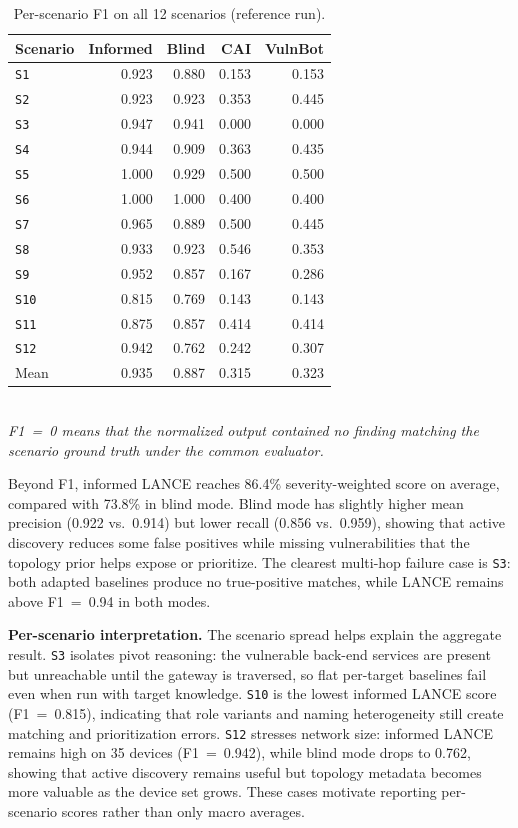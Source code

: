 \documentclass[conference,compsoc]{IEEEtran}
\newcommand{\harnessname}{\textsc{LANCE}\xspace}
\begin{document}
\begin{table}[h!]
\centering
\caption{\footnotesize Per-scenario F1 on all 12 scenarios (reference run).}
\label{tab:scenario-scores}
\scriptsize
\setlength{\tabcolsep}{3pt}
\begin{tabular}{@{}lrrrr@{}}
\toprule
Scenario & Informed & Blind & CAI & VulnBot \\
\midrule
\texttt{S1}  & 0.923 & 0.880 & 0.153 & 0.153 \\
\texttt{S2}  & 0.923 & 0.923 & 0.353 & 0.445 \\
\texttt{S3}  & 0.947 & 0.941 & 0.000 & 0.000 \\
\texttt{S4}  & 0.944 & 0.909 & 0.363 & 0.435 \\
\texttt{S5}  & 1.000 & 0.929 & 0.500 & 0.500 \\
\texttt{S6}  & 1.000 & 1.000 & 0.400 & 0.400 \\
\texttt{S7}  & 0.965 & 0.889 & 0.500 & 0.445 \\
\texttt{S8}  & 0.933 & 0.923 & 0.546 & 0.353 \\
\texttt{S9}  & 0.952 & 0.857 & 0.167 & 0.286 \\
\texttt{S10} & 0.815 & 0.769 & 0.143 & 0.143 \\
\texttt{S11} & 0.875 & 0.857 & 0.414 & 0.414 \\
\texttt{S12} & 0.942 & 0.762 & 0.242 & 0.307 \\
\midrule
Mean         & 0.935 & 0.887 & 0.315 & 0.323 \\
\bottomrule
\end{tabular}
\smallskip\\
\footnotesize\emph{F1~=~0 means that the normalized output contained no finding matching the scenario ground truth under the common evaluator.}
\end{table}

Beyond F1, informed \harnessname{} reaches 86.4\% severity-weighted score on average, compared with 73.8\% in blind mode. Blind mode has slightly higher mean precision (0.922 vs.\ 0.914) but lower recall (0.856 vs.\ 0.959), showing that active discovery reduces some false positives while missing vulnerabilities that the topology prior helps expose or prioritize. The clearest multi-hop failure case is \texttt{S3}: both adapted baselines produce no true-positive matches, while \harnessname{} remains above F1~=~0.94 in both modes.

\textbf{Per-scenario interpretation.}
The scenario spread helps explain the aggregate result. \texttt{S3} isolates pivot reasoning: the vulnerable back-end services are present but unreachable until the gateway is traversed, so flat per-target baselines fail even when run with target knowledge. \texttt{S10} is the lowest informed \harnessname{} score (F1~=~0.815), indicating that role variants and naming heterogeneity still create matching and prioritization errors. \texttt{S12} stresses network size: informed \harnessname{} remains high on 35 devices (F1~=~0.942), while blind mode drops to 0.762, showing that active discovery remains useful but topology metadata becomes more valuable as the device set grows. These cases motivate reporting per-scenario scores rather than only macro averages.
\end{document}
